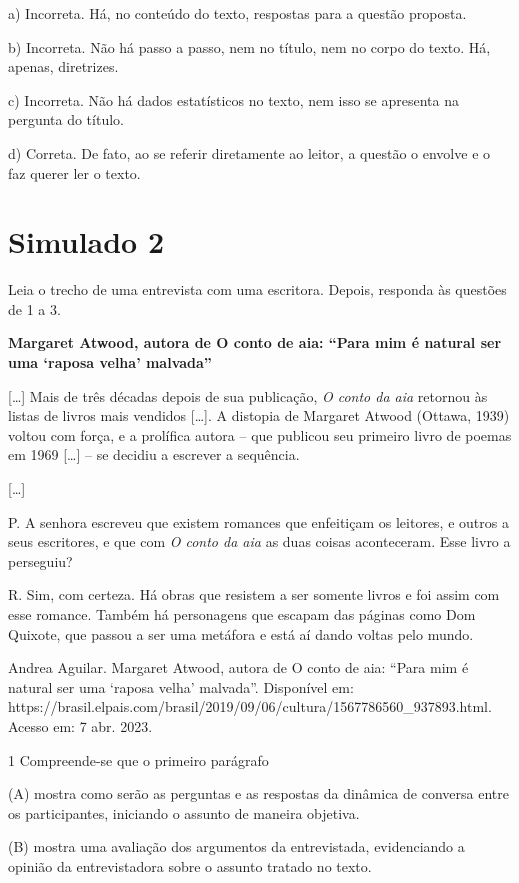 \begin{itemize}
\begin{itemize}
\begin{escolha}
\begin{escolha}
\begin{escolha}
\begin{escolha}
\begin{escolha}
a) Incorreta. Há, no conteúdo do texto, respostas para a questão
proposta.

b) Incorreta. Não há passo a passo, nem no título, nem no corpo do
texto. Há, apenas, diretrizes.

c) Incorreta. Não há dados estatísticos no texto, nem isso se apresenta
na pergunta do título.

d) Correta. De fato, ao se referir diretamente ao leitor, a questão o
envolve e o faz querer ler o texto.

\chapter{Simulado 2}

Leia o trecho de uma entrevista com uma escritora. Depois, responda às
questões de 1 a 3.

\textbf{Margaret Atwood, autora de O conto de aia: ``Para mim é natural
ser uma `raposa velha' malvada''}

{[}\ldots{}{]} Mais de três décadas depois de sua publicação, \emph{O
conto da aia} retornou às listas de livros mais vendidos {[}\ldots{}{]}.
A distopia de Margaret Atwood (Ottawa, 1939) voltou com força, e a
prolífica autora -- que publicou seu primeiro livro de poemas em 1969
{[}\ldots{}{]} -- se decidiu a escrever a sequência.

{[}\ldots{}{]}

P. A senhora escreveu que existem romances que enfeitiçam os leitores, e
outros a seus escritores, e que com \emph{O conto da aia} as duas coisas
aconteceram. Esse livro a perseguiu?

R. Sim, com certeza. Há obras que resistem a ser somente livros e foi
assim com esse romance. Também há personagens que escapam das páginas
como Dom Quixote, que passou a ser uma metáfora e está aí dando voltas
pelo mundo.

Andrea Aguilar. Margaret Atwood, autora de O conto de aia: ``Para mim é
natural ser uma `raposa velha' malvada''. Disponível em:
https://brasil.elpais.com/brasil/2019/09/06/cultura/1567786560\_937893.html.
Acesso em: 7 abr. 2023.

\num{1} Compreende-se que o primeiro parágrafo

(A) mostra como serão as perguntas e as respostas da dinâmica de
conversa entre os participantes, iniciando o assunto de maneira
objetiva.

(B) mostra uma avaliação dos argumentos da entrevistada, evidenciando a
opinião da entrevistadora sobre o assunto tratado no texto.


\end{escolha}
\end{escolha}
\end{escolha}
\end{escolha}
\end{escolha}
\end{itemize}
\end{itemize}
